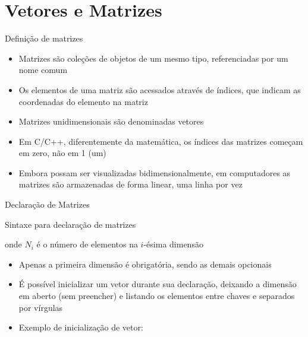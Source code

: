 \section{Vetores e Matrizes}

\begin{frame}[fragile]{Definição de matrizes}

	\begin{itemize}
		\item Matrizes são coleções de objetos de um mesmo tipo, referenciadas por um nome 
		comum 
		\item Os elementos de uma matriz são acessados através de índices, que indicam as 
        coordenadas do elemento na matriz

        \item Matrizes unidimensionais são denominadas vetores

		\item Em C/C++, diferentemente da matemática, os índices das matrizes começam em zero, 
        não em 1 (um)

        \item Embora possam ser visualizadas bidimensionalmente, em computadores as matrizes
        são armazenadas de forma linear, uma linha por vez
	\end{itemize}

\end{frame} 

\begin{frame}[fragile]{Declaração de Matrizes} 

    \begin{block}{Sintaxe para declaração de matrizes}
    \end{block}
    onde $N_i$ é o número de elementos na $i$-ésima dimensão  

	\begin{itemize}
		\item Apenas a primeira dimensão é obrigatória, sendo as demais opcionais

		\item É possível inicializar um vetor durante sua declaração, deixando a dimensão em 
        aberto (sem preencher) e listando os elementos entre chaves e separados por vírgulas

        \item Exemplo de inicialização de vetor:
	\end{itemize}

\end{frame} 
 
